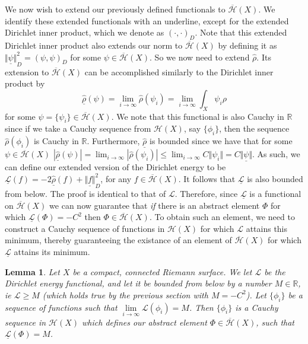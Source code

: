 \documentclass[11pt]{report}
\newtheorem{lemma}[thm]{Lemma}
\theoremstyle{definition}
\begin{document}
We now wish to extend our previously defined functionals to $\overline{\mathcal{H}}(X)$. We identify these extended functionals with an underline, except for the extended Dirichlet inner product, which we denote as $(\cdot, \cdot)_D$. Note that this extended Dirichlet inner product also extends our norm to $\overline{\mathcal{H}}(X)$ by defining it as $\underline{\Vert\psi\Vert}_D^2 = (\psi, \psi)_D$ for some $\psi \in \overline{\mathcal{H}}(X)$.
So we now need to extend $\hat{\rho}$. Its extension to $\overline{\mathcal{H}}(X)$ can be accomplished similarly to the Dirichlet inner product by
\[\underline{\hat{\rho}}(\psi) = \lim_{i \rightarrow \infty} \hat{\rho}(\psi_i) = \lim_{i \rightarrow \infty} \int_X \psi_i\rho\]
for some $\psi = \{\psi_i\} \in \overline{\mathcal{H}}(X)$. We note that this functional is also Cauchy in $\mathbb{R}$ since if we take a Cauchy sequence from $\mathcal{H}(X)$, say $\{\phi_i\}$, then the sequence $\hat{\rho}(\phi_i)$ is Cauchy in $\mathbb{R}$. Furthermore, $\underline{\hat{\rho}}$ is bounded since we have that for some $\psi \in \overline{\mathcal{H}}(X)$ $|\underline{\hat{\rho}}(\psi)| = \lim_{i \rightarrow \infty}|\hat{\rho}(\psi_i)| \leq \lim_{i \rightarrow \infty}C\Vert \psi_i \Vert = C\underline{\Vert \psi\Vert}$.
As such, we can define our extended version of the Dirichlet energy to be
$\underline{\mathcal{L}}(f) =  -2\underline{\hat{\rho}}(f) + \underline{\Vert f \Vert}_D^2$, for any $f \in \overline{\mathcal{H}}(X)$. It follows that $\underline{\mathcal{L}}$ is also bounded from below. The proof is identical to that of $\mathcal{L}$. Therefore, since $\underline{\mathcal{L}}$ is a functional on $\overline{\mathcal{H}}(X)$ we can now guarantee that \emph{if} there is an abstract element $\Phi$ for which $\underline{\mathcal{L}}(\Phi) = -C^2$ then $\Phi \in \overline{\mathcal{H}}(X)$. To obtain such an element, we need to construct a Cauchy sequence of functions in $\mathcal{H}(X)$ for which $\mathcal{L}$ attains this minimum, thereby guaranteeing the existance of an element of $\overline{\mathcal{H}}(X)$ for which $\underline{\mathcal{L}}$ attains its minimum.
\begin{lemma}
  Let $X$ be a compact, connected Riemann surface. We let $\mathcal{L}$ be the Dirichlet energy functional, and let it be bounded from below by a number $M \in \mathbb{R}$, ie $\mathcal{L} \geq M$ (which holds true by the previous section with $M=-C^2$).
  Let $\{\phi_i\}$ be a sequence of functions such that $\lim\limits_{i \rightarrow \infty}\mathcal{L}(\phi_i) = M$. Then $\{\phi_i\}$ is a Cauchy sequence in $\mathcal{H}(X)$ which defines our abstract element $\Phi \in \overline{\mathcal{H}}(X)$, such that $\underline{\mathcal{L}}(\Phi) = M$.
\end{lemma}
\end{document}
